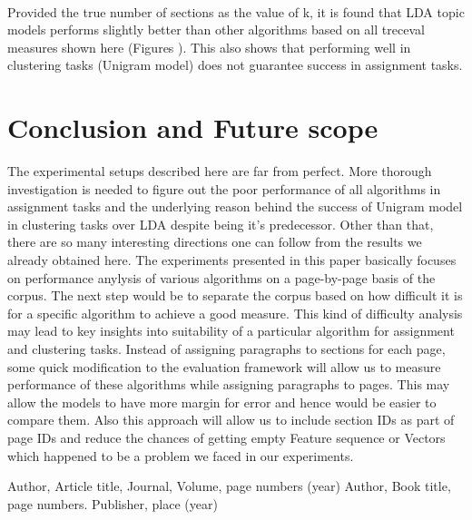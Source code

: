 \paragraph{} Provided the true number of sections as the value of k, it is found that LDA topic models performs slightly better than other algorithms based on all treceval measures shown here (Figures ). This also shows that performing well in clustering tasks (Unigram model) does not guarantee success in assignment tasks.

\section{Conclusion and Future scope}
The experimental setups described here are far from perfect. More thorough investigation is needed to figure out the poor performance of all algorithms in assignment tasks and the underlying reason behind the success of Unigram model in clustering tasks over LDA despite being it's predecessor. Other than that, there are so many interesting directions one can follow from the results we already obtained here. The experiments presented in this paper basically focuses on performance anylysis of various algorithms on a page-by-page basis of the corpus. The next step would be to separate the corpus based on how difficult it is for a specific algorithm to achieve a good measure. This kind of difficulty analysis may lead to key insights into suitability of a particular algorithm for assignment and clustering tasks. Instead of assigning paragraphs to sections for each page, some quick modification to the evaluation framework will allow us to measure performance of these algorithms while assigning paragraphs to pages. This may allow the models to have more margin for error and hence would be easier to compare them. Also this approach will allow us to include section IDs as part of page IDs and reduce the chances of getting empty Feature sequence or Vectors which happened to be a problem we faced in our experiments.


\begin{thebibliography}{}
%
%
Author, Article title, Journal, Volume, page numbers (year)
Author, Book title, page numbers. Publisher, place (year)
\end{thebibliography}



